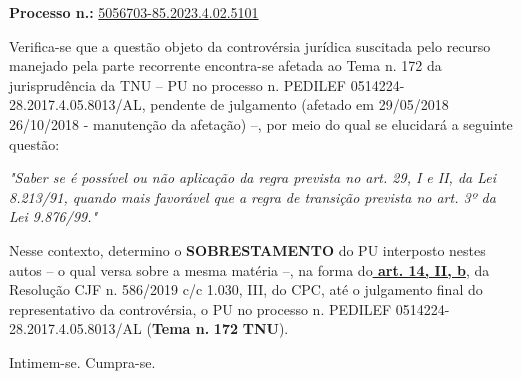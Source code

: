 \documentclass[12pt]{article}
\begin{document}
\justifying
\noindent \textbf{Processo n.: }\uline{5056703-85.2023.4.02.5101}

\noindent Verifica-se que a questão objeto da controvérsia jurídica suscitada pelo recurso manejado pela parte recorrente encontra-se afetada ao Tema n. 172 da jurisprudência da TNU – PU no processo n. PEDILEF 0514224-28.2017.4.05.8013/AL, pendente de julgamento (afetado em 29/05/2018 26/10/2018 - manutenção da afetação) –, por meio do qual se elucidará a seguinte questão:

{\leftskip=3.1cm\rightskip=0.8cm\parindent=0pt \textit{"Saber se é possível ou não aplicação da regra prevista no art. 29, I e II, da Lei 8.213/91, quando mais favorável que a regra de transição prevista no art. 3º da Lei 9.876/99."}\par}

\noindent Nesse contexto, determino o \textbf{SOBRESTAMENTO} do PU interposto nestes autos – o qual versa sobre a mesma matéria –, na forma do\textbf{\uline{ art. 14, II, b}}, da Resolução CJF n. 586/2019 c/c 1.030, III, do CPC, até o julgamento final do representativo da controvérsia, o PU no processo n. PEDILEF 0514224-28.2017.4.05.8013/AL (\textbf{Tema n. }\textbf{172 }\textbf{TNU}).

\noindent Intimem-se. Cumpra-se.
\end{document}
